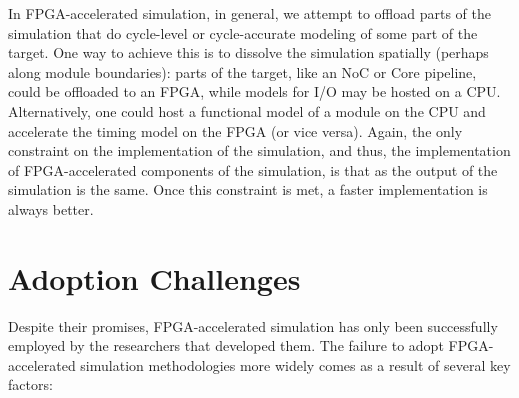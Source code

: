 
In FPGA-accelerated simulation, in general, we attempt to offload parts of the
simulation that do cycle-level or cycle-accurate modeling of some part of the
target. One way to achieve this is to dissolve the simulation spatially
(perhaps along module boundaries): parts of the target, like an NoC or Core
pipeline, could be offloaded to an FPGA, while models for I/O may be hosted on
a CPU.  Alternatively, one could host a functional model of a module on the CPU
and accelerate the timing model on the FPGA (or vice versa).  Again, the only
constraint on the implementation of the simulation, and thus, the
implementation of FPGA-accelerated components of the simulation, is that as the
output of the simulation is the same. Once this constraint is met, a faster
implementation is always better.

\section{Adoption Challenges}

Despite their promises, FPGA-accelerated simulation has only been successfully
employed by the researchers that developed them. The failure to adopt
FPGA-accelerated simulation methodologies more widely comes as a result of
several key factors:

